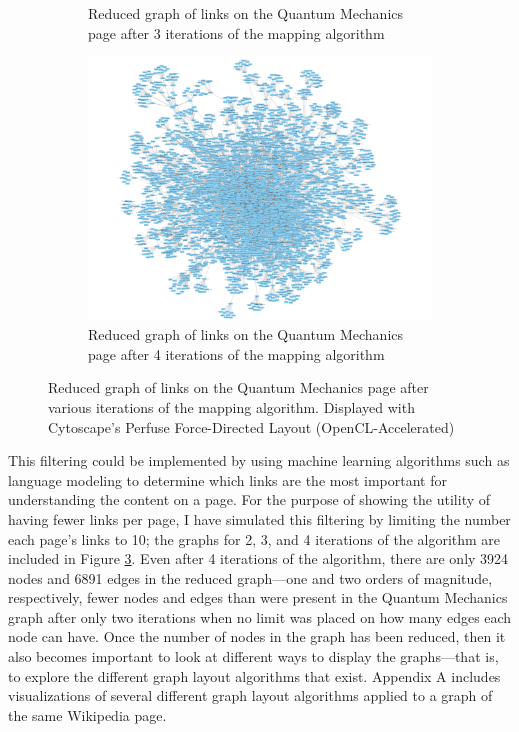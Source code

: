 \documentclass[man, 12pt, floatsintext, donotrepeattitle]{apa6}
\begin{document}
\begin{figure}
\begin{subfigure}[b]{0.3\textwidth}
        \caption{\fontsize{10pt}{12pt}\selectfont Reduced graph of links on the
        Quantum Mechanics page after 3 iterations of the mapping algorithm}
        \label{fig:3iterations}
    \end{subfigure}
    \begin{subfigure}[b]{0.3\textwidth}
        \includegraphics[width=\textwidth]{Resources/10max/4iterations/QuantumMechanics_v_3924_e_6891_b.png}
        \caption{\fontsize{10pt}{12pt}\selectfont Reduced graph of links on the
        Quantum Mechanics page after 4 iterations of the mapping algorithm}
        \label{fig:4iterations}
    \end{subfigure}
    \caption[Examples of reduced graphs]{\fontsize{10pt}{12pt}\selectfont Reduced graph of links on the
    Quantum Mechanics page after various iterations of the mapping algorithm.
    Displayed with Cytoscape's Perfuse Force-Directed Layout (OpenCL-Accelerated)}\label{fig:LimitedGraphs}
\end{figure}
This filtering could be implemented by using machine
learning algorithms such as language modeling to determine which links are the most important for understanding the
content on a page.  For the purpose of showing the utility of having fewer links per page, I have simulated this filtering by limiting the number each
page's links to 10; the graphs for 2, 3, and 4 iterations of the algorithm are
included in Figure \ref{fig:LimitedGraphs}.  Even after 4 iterations of the
algorithm, there are
only 3924 nodes and 6891 edges in the reduced graph---one and two orders of magnitude,
respectively, fewer nodes and edges than were present in the Quantum Mechanics
graph after only two iterations when no limit was placed on how many edges
each node can have.  Once the number of nodes in the graph has been reduced,
then it also becomes important to look at different ways to display the
graphs---that is, to explore the different graph layout algorithms that exist.
Appendix A includes visualizations of several different graph layout algorithms
applied to a graph of the same Wikipedia page.
\end{document}
